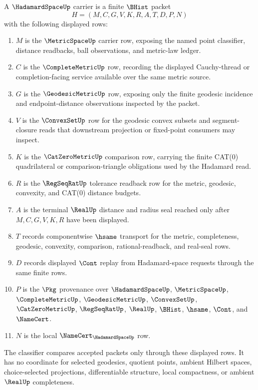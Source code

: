 \begin{definition}
\label{def:hadamard-space-carrier}
A $\HadamardSpaceUp$ carrier is a finite $\BHist$ packet
$$
H=(M,C,G,V,K,R,A,T,D,P,N)
$$
with the following displayed rows:
\begin{enumerate}
\item $M$ is the $\MetricSpaceUp$ carrier row, exposing the named point classifier, distance readbacks, ball observations, and metric-law ledger.
\item $C$ is the $\CompleteMetricUp$ row, recording the displayed Cauchy-thread or completion-facing service available over the same metric source.
\item $G$ is the $\GeodesicMetricUp$ row, exposing only the finite geodesic incidence and endpoint-distance observations inspected by the packet.
\item $V$ is the $\ConvexSetUp$ row for the geodesic convex subsets and segment-closure reads that downstream projection or fixed-point consumers may inspect.
\item $K$ is the $\CatZeroMetricUp$ comparison row, carrying the finite CAT(0) quadrilateral or comparison-triangle obligations used by the Hadamard read.
\item $R$ is the $\RegSeqRatUp$ tolerance readback row for the metric, geodesic, convexity, and CAT(0) distance budgets.
\item $A$ is the terminal $\RealUp$ distance and radius seal reached only after $M,C,G,V,K,R$ have been displayed.
\item $T$ records componentwise $\hsame$ transport for the metric, completeness, geodesic, convexity, comparison, rational-readback, and real-seal rows.
\item $D$ records displayed $\Cont$ replay from Hadamard-space requests through the same finite rows.
\item $P$ is the $\Pkg$ provenance over $\HadamardSpaceUp$, $\MetricSpaceUp$, $\CompleteMetricUp$, $\GeodesicMetricUp$, $\ConvexSetUp$, $\CatZeroMetricUp$, $\RegSeqRatUp$, $\RealUp$, $\BHist$, $\hsame$, $\Cont$, and $\NameCert$.
\item $N$ is the local $\NameCert_{\HadamardSpaceUp}$ row.
\end{enumerate}
The classifier compares accepted packets only through these displayed rows. It has no coordinate for selected geodesics, quotient points, ambient Hilbert spaces, choice-selected projections, differentiable structure, local compactness, or ambient $\RealUp$ completeness.
\end{definition}


